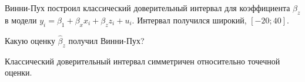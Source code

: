 
\begin{question}
Винни-Пух построил классический доверительный интервал для коэффициента \(\beta_z\) в модели
\(y_i = \beta_1 + \beta_x x_i + \beta_z z_i + u_i\).
Интервал получился широкий, \([-20; 40]\).

Какую оценку \(\hat\beta_z\) получил Винни-Пух?
\end{question}

\begin{solution}
Классический доверительный интервал симметричен относительно точечной оценки.
\end{solution}

